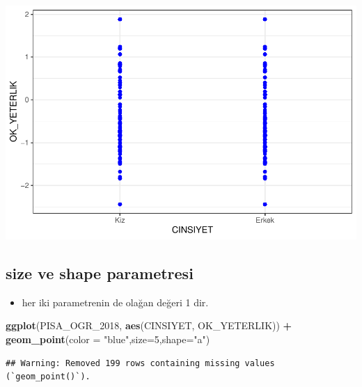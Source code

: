 \documentclass[
  oneside]{book}
\newenvironment{Shaded}{\begin{snugshade}}{\end{snugshade}}
\newcommand{\AttributeTok}[1]{\textcolor[rgb]{0.13,0.29,0.53}{#1}}
\newcommand{\DecValTok}[1]{\textcolor[rgb]{0.00,0.00,0.81}{#1}}
\newcommand{\FunctionTok}[1]{\textcolor[rgb]{0.13,0.29,0.53}{\textbf{#1}}}
\newcommand{\NormalTok}[1]{#1}
\newcommand{\SpecialCharTok}[1]{\textcolor[rgb]{0.81,0.36,0.00}{\textbf{#1}}}
\newcommand{\StringTok}[1]{\textcolor[rgb]{0.31,0.60,0.02}{#1}}
\providecommand{\tightlist}{%
  \setlength{\itemsep}{0pt}\setlength{\parskip}{0pt}}
\begin{document}
\begin{center}\includegraphics[width=1\linewidth]{15-betimleyici-istatistik_files/figure-latex/unnamed-chunk-40-1} \end{center}

\hypertarget{size-ve-shape-parametresi}{%
\subsection{\texorpdfstring{\textbf{size} ve \textbf{shape} parametresi}{size ve shape parametresi}}\label{size-ve-shape-parametresi}}

\begin{itemize}
\tightlist
\item
  her iki parametrenin de olağan değeri 1 dir.
\end{itemize}

\begin{Shaded}
\begin{Highlighting}[]
\FunctionTok{ggplot}\NormalTok{(PISA\_OGR\_2018, }\FunctionTok{aes}\NormalTok{(CINSIYET, OK\_YETERLIK)) }\SpecialCharTok{+}
  \FunctionTok{geom\_point}\NormalTok{(}\AttributeTok{color =} \StringTok{"blue"}\NormalTok{,}\AttributeTok{size=}\DecValTok{5}\NormalTok{,}\AttributeTok{shape=}\StringTok{"a"}\NormalTok{)}
\end{Highlighting}
\end{Shaded}

\begin{verbatim}
## Warning: Removed 199 rows containing missing values (`geom_point()`).
\end{verbatim}
\end{document}

